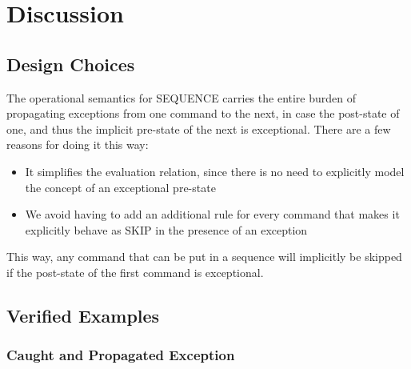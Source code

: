 \section{Discussion}

\subsection{Design Choices}
The operational semantics for SEQUENCE carries the entire burden of propagating exceptions from one command to the next, in case the post-state of one, and thus the implicit pre-state of the next is exceptional. There are a few reasons for doing it this way:

\begin{itemize}
\item It simplifies the evaluation relation, since there is no need to explicitly model the concept of an exceptional pre-state
\item We avoid having to add an additional rule for every command that makes it explicitly behave as SKIP in the presence of an exception
\end{itemize}

This way, any command that can be put in a sequence will implicitly be skipped if the post-state of the first command is exceptional.

\subsection{Verified Examples}

\subsubsection{Caught and Propagated Exception}

